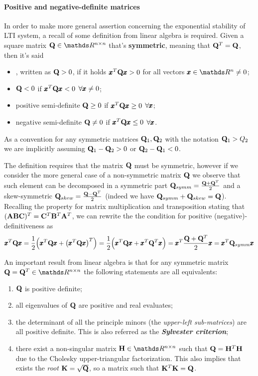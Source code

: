 	\paragraph{Positive and negative-definite matrices} In order to make more general assertion concerning the exponential stability of LTI system, a recall of some definition from linear algebra is required. Given a square matrix $\Q \in \mathds R^{n\times n}$ that's \textbf{symmetric}, meaning that $\mathbf{Q}^T = \mathbf{Q}$, then it's said
	\begin{itemize}
		\item {}, written as $\mathbf{Q} >0$, if it holds $\pmb{x}^T \mathbf{Q} \pmb{x} > 0$ for all vectors $\x \in \mathds R^n \neq 0$;
		\item {} $\mathbf{Q} <0$ if $\pmb{x}^T \mathbf{Q} \pmb{x} < 0$ $\forall \pmb{x}\neq 0$;
		\item positive semi-definite $\mathbf{Q} \geq 0$ if $\pmb{x}^T \mathbf{Q} \pmb{x} \geq 0$ $\forall \pmb{x}$;
		\item negative semi-definite $\mathbf{Q} \neq 0$ if $\pmb{x}^T \mathbf{Q} \pmb{x} \leq 0$ $\forall \pmb{x}$.
	\end{itemize}
	As a convention for any symmetric matrices $\mathbf{Q}_1,\mathbf{Q}_2$ with the notation $\mathbf{Q}_1 > Q_2$ we are implicitly assuming $\mathbf{Q}_1 - \mathbf{Q}_2 > 0$ or $\mathbf{Q}_2 - \mathbf{Q}_1 < 0$.
	\begin{note}
		The definition requires that the matrix $\mathbf{Q}$ must be symmetric, however if we consider the more general case of a non-symmetric matrix $\mathbf{Q}$ we observe that such element can be decomposed in a symmetric part $\mathbf{Q}_{symm} = \frac{\mathbf{Q} + \mathbf{Q}^T}{2}$ and a skew-symmetric $\mathbf{Q}_{skew} = \frac{\mathbf{Q}-\mathbf{Q}^T}2$ (indeed we have $\mathbf{Q}_{symm} + \mathbf{Q}_{skew} = \mathbf{Q}$). Recalling the property for matrix multiplication and transposition stating that $(\mathbf{A}\mathbf{B}\mathbf{C})^T = \mathbf{C}^T \mathbf{B}^T \mathbf{A}^T$, we can rewrite the the condition for positive (negative)-definitiveness as
		\[ \pmb{x}^T \mathbf{Q} \pmb{x} = \frac 1 2 \Big(\pmb{x}^T \mathbf{Q} \pmb{x} +\big(\pmb{x}^T \mathbf{Q} \pmb{x}\big)^T\Big) = \frac 1 2 \Big(\pmb{x}^T \mathbf{Q} \pmb{x} + \pmb{x}^T \mathbf{Q}^T \pmb{x}\Big) = \pmb{x}^T \frac{\mathbf{Q} + \mathbf{Q}^T}{2} \pmb{x} = \pmb{x}^T \mathbf{Q}_{symm} \pmb{x} \]
	\end{note}
	An important result from linear algebra is that for any symmetric matrix $\Q = \Q^T \in \mathds R^{n\times n}$ the following statements are all equivalents:
	\begin{enumerate}[\itshape i)]
		\item $\mathbf{Q}$ is positive definite;
		\item all eigenvalues of $\mathbf{Q}$ are positive and real evaluates;
		\item the determinant of all the principle minors (the \textit{upper-left sub-matrices}) are all positive definite. This is also referred as the \textbf{\textit{Sylvester criterion}};
		\item there exist a non-singular matrix $\mat H \in \mathds R^{n\times n}$ such that $\mathbf{Q} = \mathbf{H}^T \mathbf{H}$ due to the Cholesky upper-triangular factorization. This also implies that exists the \textit{root} $\mathbf{K} = \sqrt{\mathbf{Q}}$, so a matrix such that $\mathbf{K}^T \mathbf{K} = \mathbf{Q}$.
	\end{enumerate}
